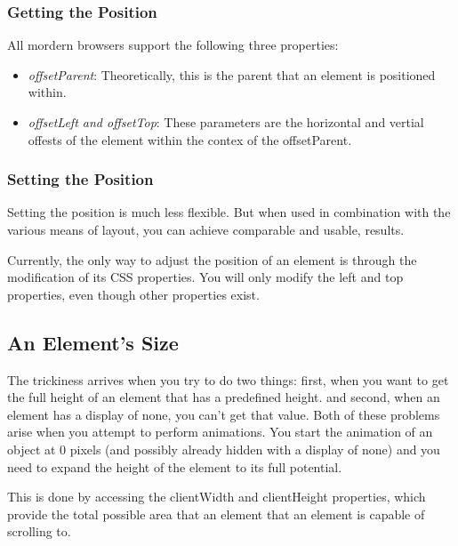 \documentclass[a4paper,11pt]{book}
\begin{document}
\subsubsection{Getting the Position}
All mordern browsers support the following three properties:
\begin{itemize}
\item \emph{offsetParent}: Theoretically, this is the parent that an element is positioned within.
\item \emph{offsetLeft and offsetTop}: These parameters are the horizontal and
vertial offests of the element within the contex of the offsetParent. 
\end{itemize}
\subsubsection{Setting the Position}
Setting the position is much less flexible. But when used in combination with
the various means of layout, you can achieve comparable and usable, results.

Currently, the only way to adjust the position of an element is through the
modification of its CSS properties. You will only modify the left and top
properties, even though other properties exist.
\subsection{An Element's Size}
The trickiness arrives when you try to do two things: first, when you want to
get the full height of an element that has a predefined height. and second, when
an element has a display of none, you can't get that value. Both of these
problems arise when you attempt to perform animations. You start the animation
of an object at 0 pixels (and possibly already hidden with a display of none)
and you need to expand the height of the element to its full potential.

This is done by accessing the clientWidth and clientHeight properties, which
provide the total possible area that an element that an element is capable of
scrolling to. 
\end{document}

